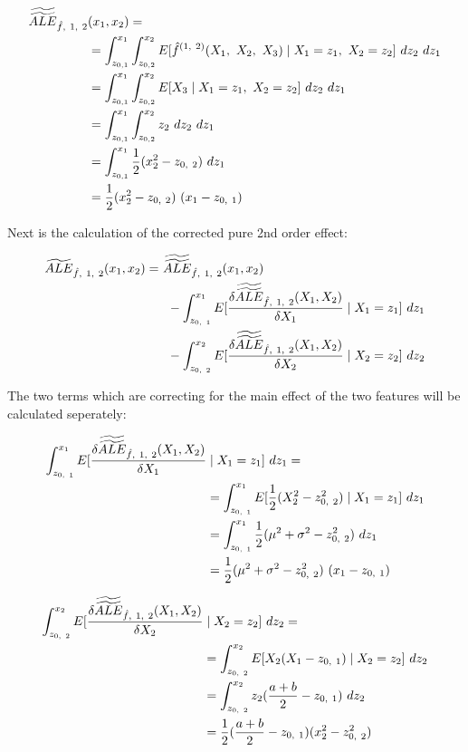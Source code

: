 \documentclass[
]{krantz}
\begin{document}
\begin{align} 
\widetilde{\widetilde{ALE}}_{\hat{f},~1,~2}&(x_1, x_2) = \notag \\
&= \int_{z_{0,1}}^{x_1}  \int_{z_{0,2}}^{x_2} E[\hat{f}^{(1,~2)}(X_1,~X_2,~X_3)\mid X_1 = z_1,~X_2 = z_2]~dz_2~dz_1 \notag \\
&= \int_{z_{0,1}}^{x_1}  \int_{z_{0,2}}^{x_2} E[X_3 \mid X_1 = z_1,~X_2 = z_2]~dz_2~dz_1 \notag \\
&= \int_{z_{0,1}}^{x_1}  \int_{z_{0,2}}^{x_2} z_2 ~dz_2~dz_1 \notag \\
&= \int_{z_{0,1}}^{x_1}  \frac{1}{2} (x_2^2 - z_{0,~2}) ~dz_1 \notag \\
&= \frac{1}{2} (x_2^2 - z_{0,~2})~(x_1 - z_{0,~1}) 
\end{align}

Next is the calculation of the corrected pure 2nd order effect:

\begin{align}
\widetilde{ALE}_{\hat{f},~1,~2}(x_1, x_2) = ~
&\widetilde{\widetilde{ALE}}_{\hat{f},~1,~2}(x_1, x_2) \notag \\
& ~ -  \int_{z_{0,~1}}^{x_1}  E[\frac{\delta\widetilde{\widetilde{ALE}}_{\hat{f},~1,~2}(X_1, X_2)}{\delta X_1}\mid X_1 = z_1]~dz_1 \notag \\
& ~ - \int_{z_{0,~2}}^{x_2}  E[\frac{\delta\widetilde{\widetilde{ALE}}_{\hat{f},~1,~2}(X_1, X_2)}{\delta X_2}\mid X_2 = z_2]~dz_2
\label{eq:ale2DExampleCorrection}
\end{align}

The two terms which are correcting for the main effect of the two features will be calculated seperately:

\begin{align}
\int_{z_{0,~1}}^{x_1}  E[\frac{\delta\widetilde{\widetilde{ALE}}_{\hat{f},~1,~2}(X_1, X_2)}{\delta X_1}
& \mid X_1 = z_1]~dz_1 = \notag \\
&= \int_{z_{0,~1}}^{x_1}  E[\frac{1}{2}(X_2^2 - z_{0, ~2}^2)\mid X_1 = z_1]~dz_1 \notag \\
&= \int_{z_{0,~1}}^{x_1}  \frac{1}{2}(\mu^2 + \sigma^2 - z_{0,~2}^2) ~dz_1 \notag \\
&= \frac{1}{2}(\mu^2 + \sigma^2 - z_{0,~2}^2)~(x_1 - z_{0,~1})
  \label{eq:ale2DExampleCorrection1}
\end{align}

\begin{align}
\int_{z_{0,~2}}^{x_2}  E[\frac{\delta\widetilde{\widetilde{ALE}}_{\hat{f},~1,~2}(X_1, X_2)}{\delta X_2} 
&\mid X_2 = z_2]~dz_2 = \notag \\
&= \int_{z_{0,~2}}^{x_2}  E[X_2 (X_1 - z_{0, ~1})\mid X_2 = z_2]~dz_2 \notag \\
&= \int_{z_{0,~2}}^{x_2}  z_2(\frac{a+b}{2} - z_{0, ~1}) ~dz_2 \notag \\
&= \frac{1}{2}(\frac{a+b}{2} - z_{0, ~1})(x_2^2 - z_{0, ~2}^2)
  \label{eq:ale2DExampleCorrection2}
\end{align}
\end{document}
